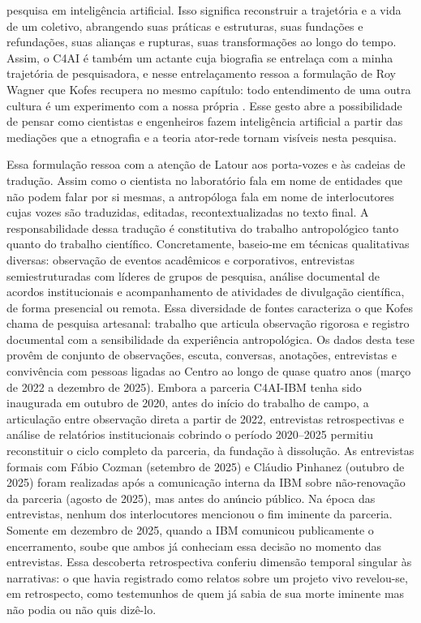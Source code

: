 pesquisa em inteligência artificial. Isso significa reconstruir a trajetória e a vida de um coletivo, abrangendo suas práticas e estruturas, suas fundações e refundações, suas alianças e rupturas, suas transformações ao longo do tempo. Assim, o C4AI é também um actante cuja biografia se entrelaça com a minha trajetória de pesquisadora, e nesse entrelaçamento ressoa a formulação de Roy Wagner que Kofes recupera no mesmo capítulo: todo entendimento de uma outra cultura é um experimento com a nossa própria \parencite[p.~296]{Kofes2015Maconaria}. Esse gesto abre a possibilidade de pensar como cientistas e engenheiros fazem inteligência artificial a partir das mediações que a etnografia e a teoria ator-rede tornam visíveis nesta pesquisa.

Essa formulação ressoa com a atenção de Latour aos porta-vozes e às cadeias de tradução. Assim como o cientista no laboratório fala em nome de entidades que não podem falar por si mesmas, a antropóloga fala em nome de interlocutores cujas vozes são traduzidas, editadas, recontextualizadas no texto final. A responsabilidade dessa tradução é constitutiva do trabalho antropológico tanto quanto do trabalho científico. Concretamente, baseio-me em técnicas qualitativas diversas: observação de eventos acadêmicos e corporativos, entrevistas semiestruturadas com líderes de grupos de pesquisa, análise documental de acordos institucionais e acompanhamento de atividades de divulgação científica, de forma presencial ou remota. Essa diversidade de fontes caracteriza o que Kofes chama de pesquisa artesanal: trabalho que articula observação rigorosa e registro documental com a sensibilidade da experiência antropológica. Os dados desta tese provêm de conjunto de observações, escuta, conversas, anotações, entrevistas e convivência com pessoas ligadas ao Centro ao longo de quase quatro anos (março de 2022 a dezembro de 2025). Embora a parceria C4AI-IBM tenha sido inaugurada em outubro de 2020, antes do início do trabalho de campo, a articulação entre observação direta a partir de 2022, entrevistas retrospectivas e análise de relatórios institucionais cobrindo o período 2020--2025 permitiu reconstituir o ciclo completo da parceria, da fundação à dissolução. As entrevistas formais com Fábio Cozman (setembro de 2025) e Cláudio Pinhanez (outubro de 2025) foram realizadas após a comunicação interna da IBM sobre não-renovação da parceria (agosto de 2025), mas antes do anúncio público. Na época das entrevistas, nenhum dos interlocutores mencionou o fim iminente da parceria. Somente em dezembro de 2025, quando a IBM comunicou publicamente o encerramento, soube que ambos já conheciam essa decisão no momento das entrevistas. Essa descoberta retrospectiva conferiu dimensão temporal singular às narrativas: o que havia registrado como relatos sobre um projeto vivo revelou-se, em retrospecto, como testemunhos de quem já sabia de sua morte iminente mas não podia ou não quis dizê-lo.
 
